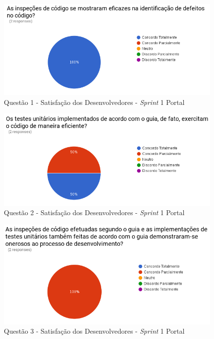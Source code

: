 \begin{figure}[!h]
\includegraphics[width=\textwidth]{figuras/s1p.png}
\caption{Questão 1 - Satisfação dos Desenvolvedores - \textit{Sprint} 1 Portal}
\end{figure}

\begin{figure}[!h]
\includegraphics[width=\textwidth]{figuras/s2p.png}
\caption{Questão 2 - Satisfação dos Desenvolvedores - \textit{Sprint} 1 Portal}
\end{figure}

\begin{figure}[!h]
\includegraphics[width=\textwidth]{figuras/s3p.png}
\caption{Questão 3 - Satisfação dos Desenvolvedores - \textit{Sprint} 1 Portal}
\end{figure}

